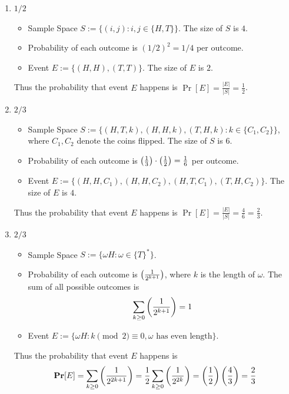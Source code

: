 \documentclass[12pt]{article}
\begin{document}
\begin{solution}
    \bbni
    \begin{enumerate}
        \item  $1/2$ 
        \begin{itemize}
            \item Sample Space $S:= \{(i, j): i, j \in \{H, T\}\}$. The size of $S$ is $4$.
            \item Probability of each outcome is $(1/2)^2 = 1/4$ per outcome.
            \item Event $E:=\{(H, H), (T,T)\}$. The size of $E$ is $2$.    
        \end{itemize}
        Thus the probability that event $E$ happens is  
        $\Pr[E] = \frac{|E|}{|S|} = \frac{1}{2}$.

        \item  $2/3$ 
        \begin{itemize}
            \item Sample Space $S:= \{(H, T, k), (H, H, k), (T, H, k): k \in \{C_1, C_2\}\}$, where $C_1, C_2$ denote the coins flipped. The size of $S$ is $6$.
            \item Probability of each outcome is $\left(\frac{1}{3}\right) \cdot \left(\frac{1}{2}\right) = \frac{1}{6}$ per outcome.
            \item Event $E:=\{(H, H, C_1), (H, H, C_2), (H, T, C_1), (T, H, C_2)\}$. The size of $E$ is $4$.    
        \end{itemize}
        Thus the probability that event $E$ happens is  
        $\Pr[E] = \frac{|E|}{|S|} = \frac{4}{6} = \frac{2}{3}$.

        \bbni 
        
        \item  $2/3$ 
        \begin{itemize}
            \item Sample Space $S:= \{\omega H: \omega \in \{T\}^*\}$. 
            \item Probability of each outcome is $\left(\frac{1}{2^{k+1}}\right)$, where $k$ is the length of $\omega$. The sum of all possible outcomes is 
            \[\sum_{k\geq 0} \left(\frac{1}{2^{k+1}}\right) = 1\]
            \item Event $E:=\{\omega H: k \pmod{2} \equiv 0, \omega \text{ has even length}\}$.    
        \end{itemize}
        Thus the probability that event $E$ happens is 
        \[\operatorname{\mathbf{Pr}}[E]  = \sum_{k \geq 0} \left(\frac{1}{2^{2k+1}}\right) = \frac{1}{2} \sum_{k \geq 0} \left(\frac{1}{2^{2k}}\right) = \left(\frac{1}{2}\right)\left(\frac{4}{3}\right) = \frac{2}{3} \]
    \end{enumerate}
\end{solution}
\end{document}
